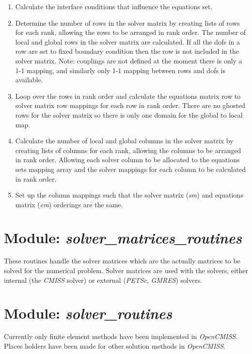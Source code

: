 \begin{enumerate}
 \item Calculate the interface conditions that influence the equations set.
 \item Determine the number of rows in the solver matrix by creating lists of 
rows for each rank, allowing the rows to be arranged in rank order. The number 
of local and global rows in the solver matrix are calculated. If all the dofs 
in a row are set to fixed boundary condition then the row is not included in 
the solver matrix. Note: couplings are not defined at the moment there is only 
a 1-1 mapping, and similarly only 1-1 mapping between rows and dofs is 
available. 
 \item Loop over the rows in rank order and calculate the equations matrix row
to solver matrix row mappings for each row in rank order. There are no ghosted 
rows for the solver matrix so there is only one domain for the global to local 
map. 
 \item Calculate the number of local and global columns in the solver matrix by 
creating lists of columns for each rank, allowing the columns to be arranged 
in rank order. Allowing each solver column to be allocated to the equations 
sets mapping array and the solver mappings for each column to be calculated
in rank order.
 \item Set up the column mappings such that the solver matrix (\emph{sm}) 
and equations matrix (\emph{em}) orderings are the same.
\end{enumerate}


\section{Module: \emph{solver\_matrices\_routines}}
\label{sec:solvermatricesroutines}

These routines handle the solver matrices which are the actually matrices to 
be solved for the numerical problem. Solver matrices are used with the solvers, 
either internal (the \emph{CMISS} solver) or external (\emph{PETSc}, 
\emph{GMRES}) solvers.


\section{Module: \emph{solver\_routines}}
\label{sec:solverroutines}

Currently only finite element methods have been implemented in 
\emph{OpenCMISS}. Places holders have been made for other solution methods 
in \emph{OpenCMISS}.


